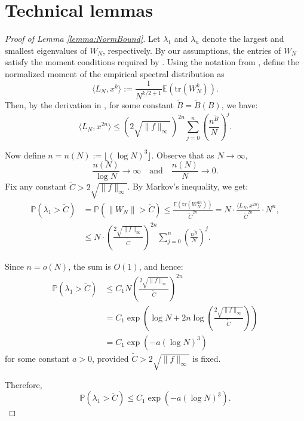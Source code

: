 \documentclass[11pt, reqno]{amsart}
\numberwithin{equation}{section}
\begin{document}
\section{Technical lemmas} \label{appendix:B}
\begin{proof}[Proof of Lemma \ref{lemma:NormBound}]
Let \( \lambda_1 \) and \( \lambda_n \) denote the largest and smallest eigenvalues of \( W_N \), respectively. By our assumptions, the entries of \( W_N \) satisfy the moment conditions required by \cite[Theorem 2.1.22]{anderson2010introduction}. Using the notation from \cite{anderson2010introduction}, define the normalized moment of the empirical spectral distribution as
\[
\langle L_N, x^k \rangle := \frac{1}{N^{k/2 + 1}} \mathbb{E}(\mathrm{tr}(W_N^k)).
\]
Then, by the derivation in \cite[Theorem 2.1.22]{anderson2010introduction}, for some constant \( \tilde{B} = \tilde{B}(B) \), we have:
\[
\langle L_N, x^{2n} \rangle \le (2\sqrt{\|f\|_\infty})^{2n} \sum_{j=0}^n \left( \frac{n^{\tilde{B}}}{N} \right)^j.
\]

Now define \( n = n(N) := \lfloor (\log N)^3 \rfloor \). Observe that as \( N \to \infty \),
\[
\frac{n(N)}{\log N} \to \infty \quad \text{and} \quad \frac{n(N)}{N} \to 0.
\]
Fix any constant \( \tilde{C} > 2\sqrt{\|f\|_\infty} \). By Markov's inequality, we get:
\begin{align*}
\mathbb{P}(\lambda_1 > \tilde{C}) 
&= \mathbb{P}\left( \|W_N\| > \tilde{C} \right) 
\le \frac{\mathbb{E}(\mathrm{tr}(W_N^{2n}))}{\tilde{C}^{2n}} 
= N \cdot \frac{\langle L_N, x^{2n} \rangle}{\tilde{C}^{2n}} \cdot N^{n},\\
&\le N \cdot \left( \frac{2\sqrt{\|f\|_\infty}}{\tilde{C}} \right)^{2n} \sum_{j=0}^{n} \left( \frac{n^{\tilde{B}}}{N} \right)^j.
\end{align*}

Since \( n = o(N) \), the sum is \( O(1) \), and hence:
\begin{align*}
\mathbb{P}(\lambda_1 > \tilde{C}) 
&\le C_1 N \left( \frac{2\sqrt{\|f\|_\infty}}{\tilde{C}} \right)^{2n} \\
&= C_1 \exp \left( \log N + 2n \log \left( \frac{2\sqrt{\|f\|_\infty}}{\tilde{C}} \right) \right) \\
&= C_1 \exp \left( -a (\log N)^3 \right)
\end{align*}
for some constant \( a > 0 \), provided \( \tilde{C} > 2\sqrt{\|f\|_\infty} \) is fixed.

Therefore,
\begin{equation} \label{norm.upper}
\mathbb{P} \left( \lambda_1 > \tilde{C} \right) \le C_1 \exp \left( -a (\log N)^3 \right).
\end{equation}


\end{proof}
\end{document}
